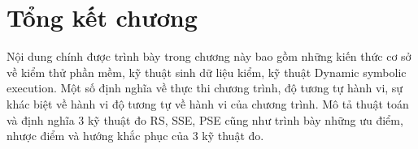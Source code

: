 %
%

\section*{Tổng kết chương}  
Nội dung chính được trình bày trong chương này bao gồm những kiến thức cơ sở về kiểm thử phần mềm, kỹ thuật sinh dữ liệu kiểm, kỹ thuật Dynamic symbolic execution. Một số định nghĩa về thực thi chương trình, độ tương tự hành vi, sự khác biệt về hành vi độ tương tự về hành vi của chương trình. Mô tả thuật toán và định nghĩa 3 kỹ thuật đo RS, SSE, PSE cũng như trình bày những ưu điểm, nhược điểm và hướng khắc phục của 3 kỹ thuật đo. 
  

